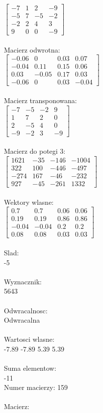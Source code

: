 \documentclass[a4paper,12pt]{article}
\begin{document}
$\begin{bmatrix} -7&1&2&-9\\-5&7&-5&-2\\-2&2&4&3\\9&0&0&-9 \end{bmatrix}$
\\
\\
Macierz odwrotna:\\

$\begin{bmatrix} -0.06&0&0.03&0.07\\-0.04&0.11&0.15&0.06\\0.03&-0.05&0.17&0.03\\-0.06&0&0.03&-0.04 \end{bmatrix}$
\\
\\
Macierz transponowana:\\

$\begin{bmatrix} -7&-5&-2&9\\1&7&2&0\\2&-5&4&0\\-9&-2&3&-9 \end{bmatrix}$
\\
\\
Macierz do potegi 3:\\

$\begin{bmatrix} 1621&-35&-146&-1004\\322&100&-446&-497\\-274&167&-46&-232\\927&-45&-261&1332 \end{bmatrix}$
\\
\\
Wektory wlasne:\\

$\begin{bmatrix} 0.7&0.7&0.06&0.06\\0.19&0.19&0.86&0.86\\-0.04&-0.04&0.2&0.2\\0.08&0.08&0.03&0.03 \end{bmatrix}$
\\
\\
Slad:\\
-5
\\
\\
Wyznacznik:\\
5643
\\
\\
Odwracalnosc:\\
Odwracalna
\\
\\
Wartosci wlasne:\\
-7.89 -7.89 5.39 5.39
\\
\\
Suma elementow:\\
-11
\\
\newpage
Numer macierzy:
159
\\
\\
Macierz:\\
\end{document}
